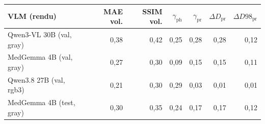 \begin{tabular}{lrrrrrr}
\toprule
VLM (rendu) & MAE vol. & SSIM vol. & $\gamma_\text{ph}$ & $\gamma_\text{pr}$ & $\Delta D_\text{pr}$ & $\Delta D98_\text{pr}$ \\
\midrule
Qwen3-VL 30B (val, gray) & 0,38 & 0,42 & 0,25 & 0,28 & 0,28 & 0,12 \\
MedGemma 4B (val, gray) & 0,27 & 0,30 & 0,09 & 0,15 & 0,15 & 0,11 \\
Qwen3.8 27B (val, rgb3) & 0,21 & 0,30 & 0,29 & 0,03 & 0,01 & 0,01 \\
MedGemma 4B (test, gray) & 0,30 & 0,35 & 0,24 & 0,17 & 0,17 & 0,12 \\
\bottomrule
\end{tabular}
